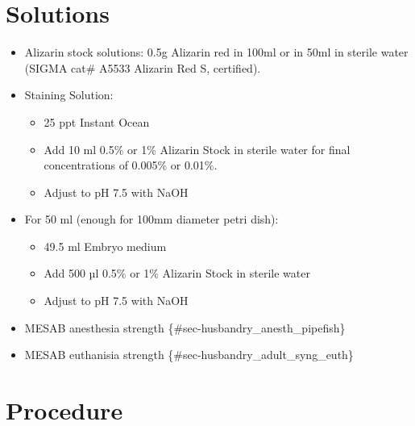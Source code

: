 \documentclass[
  letterpaper,
  DIV=11,
  numbers=noendperiod]{scrreprt}
\providecommand{\tightlist}{%
  \setlength{\itemsep}{0pt}\setlength{\parskip}{0pt}}\usepackage{longtable,booktabs,array}
\begin{document}
\hypertarget{solutions-54}{%
\section{Solutions}\label{solutions-54}}

\begin{itemize}
\tightlist
\item
  Alizarin stock solutions: 0.5g Alizarin red in 100ml or in 50ml in
  sterile water (SIGMA cat\# A5533 Alizarin Red S, certified).
\item
  Staining Solution:

  \begin{itemize}
  \tightlist
  \item
    25 ppt Instant Ocean
  \item
    Add 10 ml 0.5\% or 1\% Alizarin Stock in sterile water for final
    concentrations of 0.005\% or 0.01\%.
  \item
    Adjust to pH 7.5 with NaOH
  \end{itemize}
\item
  For 50 ml (enough for 100mm diameter petri dish):

  \begin{itemize}
  \tightlist
  \item
    49.5 ml Embryo medium
  \item
    Add 500 µl 0.5\% or 1\% Alizarin Stock in sterile water
  \item
    Adjust to pH 7.5 with NaOH
  \end{itemize}
\item
  MESAB anesthesia strength \{\#sec-husbandry\_anesth\_pipefish\}
\item
  MESAB euthanisia strength \{\#sec-husbandry\_adult\_syng\_euth\}
\end{itemize}

\hypertarget{procedure-58}{%
\section{Procedure}\label{procedure-58}}
\end{document}

